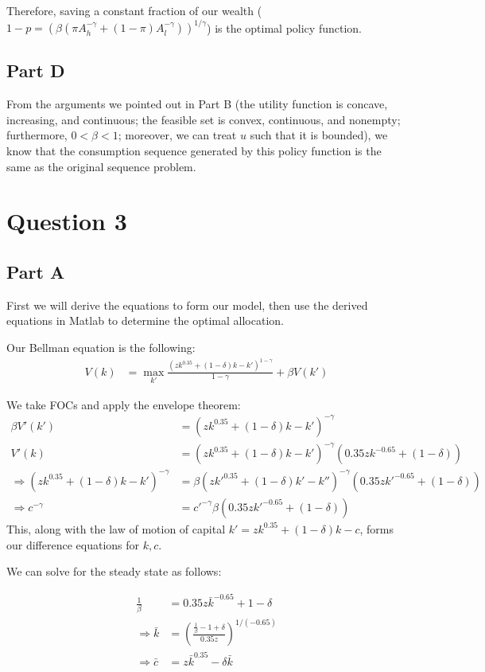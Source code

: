 \documentclass[11pt]{article} %
\begin{document}
Therefore, saving a constant fraction of our wealth ($1-p =   (\beta (\pi A_h^{-\gamma} + (1-\pi) A_l^{-\gamma}))^{1/\gamma}$) is the optimal policy function.

\subsection{Part D}
From the arguments we pointed out in Part B (the utility function is concave, increasing, and continuous; the feasible set is convex, continuous, and nonempty; furthermore, $0<\beta<1$; moreover, we can treat $u$ such that it is bounded), we know that the consumption sequence generated by this policy function is the same as the original sequence problem.

\section{Question 3}
\subsection{Part A}
First we will derive the equations to form our model, then use the derived equations in Matlab to determine the optimal allocation.

Our Bellman equation is the following:
\begin{align*}
V(k) &= \max_{k'} \frac{(zk^{0.35} + (1-\delta)k - k')^{1-\gamma}}{1-\gamma} +\beta V(k')
\end{align*}

We take FOCs and apply the envelope theorem:
\begin{align*}
\beta V'(k') &=(zk^{0.35} + (1-\delta)k - k')^{-\gamma} \\
V'(k) &= (zk^{0.35} + (1-\delta)k - k')^{-\gamma}(0.35zk^{-0.65} +(1-\delta)) \\
\Rightarrow (zk^{0.35} + (1-\delta)k - k')^{-\gamma} &= \beta (zk'^{0.35} + (1-\delta)k' - k'')^{-\gamma}(0.35zk'^{-0.65} +(1-\delta))\\
\Rightarrow c^{-\gamma} &= c'^{-\gamma} \beta(0.35zk'^{-0.65}+(1-\delta))
\end{align*}
This, along with the law of motion of capital $k' = zk^{0.35} +(1-\delta)k - c$, forms our difference equations for $k,c$.

We can solve for the steady state as follows:

\begin{align*}
\frac{1}{\beta} &= 0.35z\bar{k}^{-0.65} +1 - \delta\\
\Rightarrow \bar{k} &= \left(\frac{\frac{1}{\beta}-1+\delta}{0.35z}\right)^{1/(-0.65)}\\
\Rightarrow \bar{c} &= z\bar{k}^{0.35} - \delta \bar{k}
\end{align*}
\end{document}
